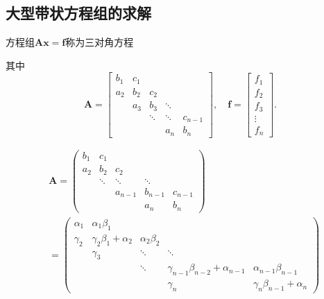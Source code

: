 \subsection{大型带状方程组的求解}
\begin{definition}[三对角方程]
    方程组$\boldsymbol{Ax} = \boldsymbol{f}$称为三对角方程

    其中
    \[
        \boldsymbol{A}=\begin{bmatrix}
            b_1&c_1&&&\\
            a_2&b_2&c_2&&\\
            &a_3&b_3&\ddots&\\
            &&\ddots&\ddots&c_{n-1}\\
            &&&a_n&b_n
        \end{bmatrix},\quad 
        \boldsymbol{f}=\begin{bmatrix}
            f_1\\f_2\\f_3\\\vdots\\f_n
            \end{bmatrix}.
    \]
\end{definition}
\[
    \begin{aligned}
        &\boldsymbol{A}=
        \begin{pmatrix}
            b_1&c_1&&&\\
            a_2&b_2&c_2&&\\
            &\ddots&\ddots&\ddots&\\
            &&a_{n-1}&b_{n-1}&c_{n-1}\\
            &&&a_n&b_n
        \end{pmatrix}\\
        &=\begin{pmatrix}
            \alpha_1&\alpha_1\beta_1&&&\\
            \gamma_2&\gamma_2\beta_1+\alpha_2&\alpha_2\beta_2&&\\
            &\gamma_3&\ddots&\ddots&\\&&\ddots&\gamma_{n-1}\beta_{n-2}+\alpha_{n-1}&\alpha_{n-1}\beta_{n-1}\\
            &&&\gamma_n&\gamma_n\beta_{n-1}+\alpha_n
        \end{pmatrix}
    \end{aligned}
\]
